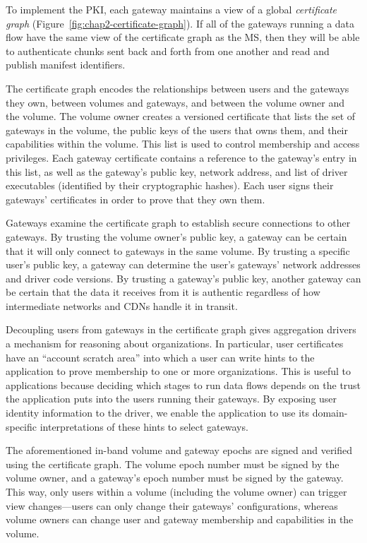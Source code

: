To implement the PKI, each gateway maintains a view of a global \emph{certificate
graph} (Figure~\ref{fig:chap2-certificate-graph}).  If all
of the gateways running a data flow have the same view of the certificate graph
as the MS, then they will be able to authenticate chunks sent back and forth from one another
and read and publish manifest identifiers.

The certificate graph encodes the relationships between users and the gateways
they own, between volumes and gateways, and between the volume owner and the volume.
The volume owner creates a versioned certificate that lists the set of gateways
in the volume, the public keys of the users that owns them, and their capabilities within the
volume.  This list is used to control membership and access
privileges.  Each gateway certificate contains a reference to the gateway's
entry in this list, as well as the gateway's public key, network address, and list of
driver executables (identified by their cryptographic hashes).  Each user signs
their gateways' certificates in order to prove that they own them.

Gateways examine the certificate graph to establish secure connections to other
gateways.  By trusting the volume owner's public key, a gateway can be certain that it will
only connect to gateways in the same volume.  By trusting a specific user's
public key, a gateway can determine the user's gateways' network addresses and
driver code versions.  By trusting a gateway's public key, another gateway can be
certain that the data it receives from it is authentic regardless of how
intermediate networks and CDNs handle it in transit.

Decoupling users from gateways in the certificate graph gives aggregation
drivers a mechanism for reasoning about organizations.  In particular, user
certificates have an ``account scratch area'' into which a user can write hints to the
application to prove membership to one or more organizations.  This is useful
to applications because deciding which
stages to run data flows depends on the trust the application
puts into the users running their gateways.  By exposing user identity
information to the driver, we enable the application to use its domain-specific
interpretations of these hints to select gateways.

The aforementioned in-band volume and gateway epochs are signed and
verified using the certificate graph.  The volume epoch number must be signed by
the volume owner, and a gateway's epoch number must be signed by the gateway.
This way, only users within a volume (including the volume owner) can trigger
view changes---users can only change their gateways' configurations, whereas volume
owners can change user and gateway membership and capabilities in the volume.

